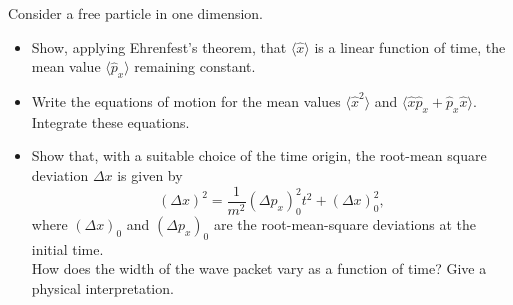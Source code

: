 \documentclass[12pt,a4paper]{article}
\newenvironment{problem}[2][Problem]{\begin{trivlist}
\item[\hskip \labelsep {\bfseries #1}\hskip \labelsep {\bfseries #2.}]}{\end{trivlist}}
\begin{document}
\begin{problem}{1}
[C-T Exercise 3-4] Consider a free particle in one dimension.
\begin{itemize}
\item[(a)] Show, applying Ehrenfest's theorem, that $\langle\hat{x}\rangle$ is a linear function of time, the mean value $\langle\hat{p}_x\rangle$ remaining constant.
\item[(b)] Write the equations of motion for the mean values $\langle\hat{x}^2\rangle$ and $\langle\hat{x}\hat{p}_x+\hat{p}_x\hat{x}\rangle$. Integrate these equations.
\item[(c)] Show that, with a suitable choice of the time origin, the root-mean square deviation $\Delta x$ is given by
\[
(\Delta x)^2=\frac{1}{m^2}(\Delta p_x)_0^2t^2+(\Delta x)_0^2,
\]
where $(\Delta x)_0$ and $(\Delta p_x)_0$ are the root-mean-square deviations at the initial time.\\
How does the width of the wave packet vary as a function of time? Give a physical interpretation.
\end{itemize}
\end{problem}
\end{document}
